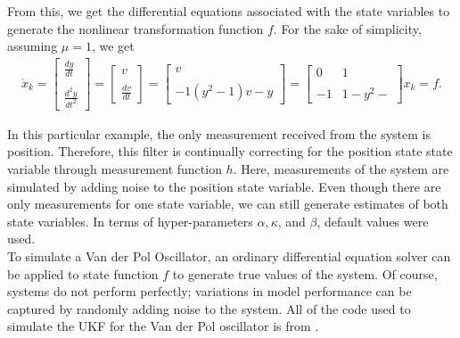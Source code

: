 \noindent From this, we get the differential equations associated with the state variables to generate the nonlinear transformation function $f$. For the sake of simplicity, assuming $\mu = 1$, we get
\begin{align*}
\dot x_k  = 
	\begin{bmatrix}
           \frac{dy}{dt}  \\ \\
           \frac{d^2y}{dt^2} 
           \end{bmatrix} = 
           \begin{bmatrix}
          v \\ \\
           \frac{dv}{dt} 
           \end{bmatrix}  =
           \begin{bmatrix}
           v \\ \\
           -1 (y^2 - 1)v - y 
           \end{bmatrix}=
           \begin{bmatrix}
           0 & 1 \\ \\
           -1& 1- y^2 - 
           \end{bmatrix} x_k 
           =
           f.
\end{align*}


\noindent In this particular example, the only measurement received from the system is position. Therefore, this filter is continually correcting for the position state state variable through measurement function $h$. Here, measurements of the system are simulated by adding noise to the position state variable. Even though there are only measurements for one state variable, we can still generate estimates of both state variables. In terms of hyper-parameters $\alpha, \kappa$, and $\beta$, default values were used.\\ 

\noindent To simulate a Van der Pol Oscillator, an ordinary differential equation solver can be applied to state function $f$ to generate true values of the system. Of course, systems do not perform perfectly; variations in model performance can be captured by randomly adding noise to the system. All of the code used to simulate the UKF for the Van der Pol oscillator is from \cite{matlab_simulink}. \\


